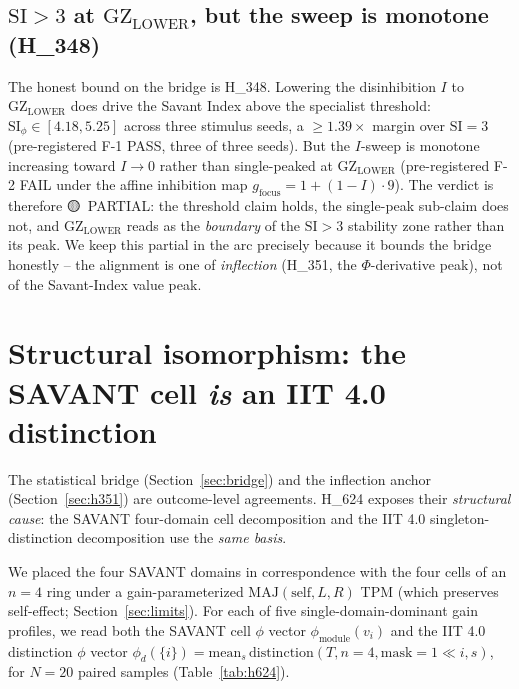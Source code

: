 \documentclass[11pt,a4paper]{article}
\providecommand{\tierYellow}{🟡}
\newcommand{\GZL}{\mathrm{GZ_{LOWER}}}
\newcommand{\Svi}{\mathrm{SI}}
\begin{document}
\subsection{$\Svi>3$ at $\GZL$, but the sweep is monotone (H\_348)}
\label{sec:h348}
The honest bound on the bridge is H\_348. Lowering the disinhibition $I$
to $\GZL$ does drive the Savant Index above the specialist threshold:
$\Svi_\phi \in [4.18, 5.25]$ across three stimulus seeds, a $\ge 1.39\times$
margin over $\Svi=3$ (pre-registered F-1 PASS, three of three seeds). But
the $I$-sweep is monotone increasing toward $I\!\to\!0$ rather than
single-peaked at $\GZL$ (pre-registered F-2 FAIL under the affine
inhibition map $g_{\mathrm{focus}}=1+(1-I)\cdot 9$). The verdict is
therefore \tierYellow\ PARTIAL: the threshold claim holds, the
single-peak sub-claim does not, and $\GZL$ reads as the \emph{boundary} of
the $\Svi>3$ stability zone rather than its peak. We keep this partial in
the arc precisely because it bounds the bridge honestly -- the alignment
is one of \emph{inflection} (H\_351, the $\Phi$-derivative peak), not of
the Savant-Index value peak.

\section{Structural isomorphism: the SAVANT cell \emph{is} an IIT 4.0 distinction}
\label{sec:iso}

The statistical bridge (Section~\ref{sec:bridge}) and the inflection anchor
(Section~\ref{sec:h351}) are outcome-level agreements. H\_624 exposes their
\emph{structural cause}: the SAVANT four-domain cell decomposition and the
IIT 4.0 singleton-distinction decomposition use the \emph{same basis}.

We placed the four SAVANT domains in correspondence with the four cells of
an $n=4$ ring under a gain-parameterized $\mathrm{MAJ}(\text{self},L,R)$
TPM (which preserves self-effect; Section~\ref{sec:limits}). For each of
five single-domain-dominant gain profiles, we read both the SAVANT cell
$\phi$ vector $\phi_{\mathrm{module}}(v_i)$ and the IIT 4.0 distinction
$\phi$ vector $\phi_d(\{i\}) = \mathrm{mean}_s\,\mathrm{distinction}(T,
n{=}4, \mathrm{mask}{=}1{\ll}i, s)$, for $N=20$ paired samples
(Table~\ref{tab:h624}).
\end{document}
